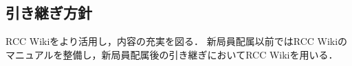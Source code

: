 \subsection*{引き継ぎ方針}


RCC Wikiをより活用し，内容の充実を図る．
新局員配属以前ではRCC Wikiのマニュアルを整備し，新局員配属後の引き継ぎにおいてRCC Wikiを用いる．
